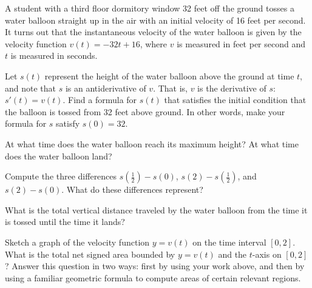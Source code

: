 \begin{pa} \label{PA:4.4}
A student with a third floor dormitory window 32 feet off the ground tosses a water balloon straight up in the air with an initial velocity of 16 feet per second.  It turns out that the instantaneous velocity of the water balloon is given by the velocity function $v(t) = -32t + 16$, where $v$ is measured in feet per second and $t$ is measured in seconds.
\ba
	\item Let $s(t)$ represent the height of the water balloon above the ground at time $t$, and note that $s$ is an antiderivative of $v$.  That is, $v$ is the derivative of $s$: $s'(t) = v(t)$.  Find a formula for $s(t)$ that satisfies the initial condition that the balloon is tossed from 32 feet above ground.  In other words, make your formula for $s$ satisfy $s(0) = 32$.
	\item At what time does the water balloon reach its maximum height?  At what time does the water balloon land?
	\item Compute the three differences $s(\frac{1}{2}) - s(0)$, $s(2) - s(\frac{1}{2})$, and $s(2) - s(0)$.  What do these differences represent?
	\item What is the total vertical distance traveled by the water balloon from the time it is tossed until the time it lands?
	\item Sketch a graph of the velocity function $y = v(t)$ on the time interval $[0,2]$.  What is the total net signed area bounded by $y = v(t)$ and the $t$-axis on $[0,2]$?  Answer this question in two ways:  first by using your work above, and then by using a familiar geometric formula to compute areas of certain relevant regions.
\ea
\end{pa} 
\afterpa